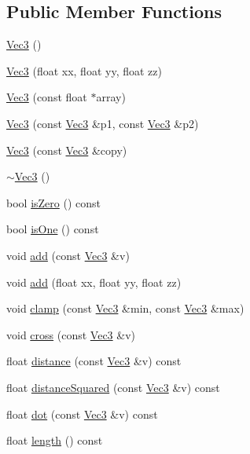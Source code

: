 \subsection*{Public Member Functions}
\begin{DoxyCompactItemize}
\item 
\hyperlink{classVec3_a4450bf868c5115de1f2db066cb7067f4}{Vec3} ()
\item 
\hyperlink{classVec3_a891a2f306b0721962c7c1e92c9b43bf8}{Vec3} (float xx, float yy, float zz)
\item 
\hyperlink{classVec3_ab47d96e653c508d9160f572f711028f9}{Vec3} (const float $\ast$array)
\item 
\hyperlink{classVec3_a565e372bc20d212a9f4724b9bb92f8d0}{Vec3} (const \hyperlink{classVec3}{Vec3} \&p1, const \hyperlink{classVec3}{Vec3} \&p2)
\item 
\hyperlink{classVec3_aa1cc33c5de48f8550cbd4f05c7dcccff}{Vec3} (const \hyperlink{classVec3}{Vec3} \&copy)
\item 
\hyperlink{classVec3_a1f5422fc4645496196292fa5314ef77c}{$\sim$\+Vec3} ()
\item 
bool \hyperlink{classVec3_a614a019ea8f0028d86bb9b6738e39339}{is\+Zero} () const
\item 
bool \hyperlink{classVec3_a8fcba789d88686eeb94336dae1c1deb9}{is\+One} () const
\item 
void \hyperlink{classVec3_a7d60e09ff6ab05a86025a209070c471c}{add} (const \hyperlink{classVec3}{Vec3} \&v)
\item 
void \hyperlink{classVec3_a5d7d749540c1231440e59de02ad37939}{add} (float xx, float yy, float zz)
\item 
void \hyperlink{classVec3_a034818aeffd0dc22fd72dd8142687494}{clamp} (const \hyperlink{classVec3}{Vec3} \&min, const \hyperlink{classVec3}{Vec3} \&max)
\item 
void \hyperlink{classVec3_af4d6ddfb98bf0cfc9892f9c0dc479a17}{cross} (const \hyperlink{classVec3}{Vec3} \&v)
\item 
float \hyperlink{classVec3_ae63145f5152b7453d9f2047ccca8b89f}{distance} (const \hyperlink{classVec3}{Vec3} \&v) const
\item 
float \hyperlink{classVec3_acc8f986cd9f852f7872c10d26c651e2e}{distance\+Squared} (const \hyperlink{classVec3}{Vec3} \&v) const
\item 
float \hyperlink{classVec3_a7dde977821ca85d8651f4c91e35d4275}{dot} (const \hyperlink{classVec3}{Vec3} \&v) const
\item 
float \hyperlink{classVec3_a54be9143adb871a478ea3de19ca23f3b}{length} () const

\end{DoxyCompactItemize}
